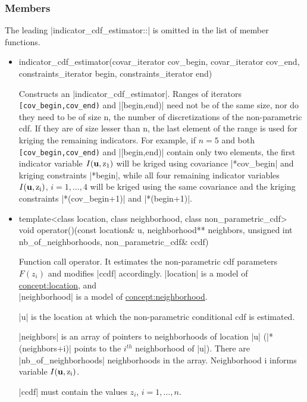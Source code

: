 \documentclass[12pt,twoside]{report}
\newcommand{\mloc}[1]{\rm{\bf #1}}
\begin{document}
\htmlrule[CLEAR=all]  \subsubsection*{Members}
The leading |indicator_cdf_estimator::| is omitted in the list of member functions.

\begin{itemize}

\item
 \begin{code} 
indicator_cdf_estimator(covar_iterator cov_begin, 
                        covar_iterator cov_end,
                        constraints_iterator begin, 
                        constraints_iterator end)
\end{code}

Constructs an |indicator_cdf_estimator|. Ranges of iterators \\ \texttt{[cov\_begin,cov\_end)} and |[begin,end)| need not be of the same size, nor do they need to be of size n, the number of discretizations of the non-parametric cdf. If they are of size lesser than n, the last element of the range is used for kriging the remaining indicators. For example, if $n=5$ and both \texttt{[cov\_begin,cov\_end)} and |[begin,end)| contain only two elements, the first indicator variable $I(\mloc{u},z_1)$ will be kriged using covariance |*cov_begin| and kriging constraints |*begin|, while all four remaining indicator variables $I(\mloc{u},z_i)$, $i=1,\ldots,4$ will be kriged using the same covariance and the kriging constraints |*(cov_begin+1)| and |*(begin+1)|.


\item
 \begin{code}
template<class location, class neighborhood, class non_parametric_cdf> 
void operator()(const location& u, neighborhood** neighbors,
                unsigned int nb_of_neighborhoods,
                non_parametric_cdf& ccdf)
  \end{code}

Function call operator. It estimates the non-parametric cdf parameters $F(z_i)$ and modifies |ccdf| accordingly. 
|location| is a model of \hyperref{Location}{Location (see Section}{)}{concept:location}, and \\|neighborhood| is a model of \hyperref{Neighborhood}{Neighborhood (see Section}{)}{concept:neighborhood}. 

|u| is the location at which the non-parametric conditional cdf is estimated. 

|neighbors| is an array of pointers to neighborhoods of location |u| (|*(neighbors+i)| points to the $i^{th}$ neighborhood of |u|). There are |nb_of_neighborhoods| neighborhoods in the array. Neighborhood i informs variable $I(\mloc{u},z_i)$.

|ccdf| must contain the values $z_i$, $i=1,\ldots,n$. 
\end{itemize}
\end{document}
